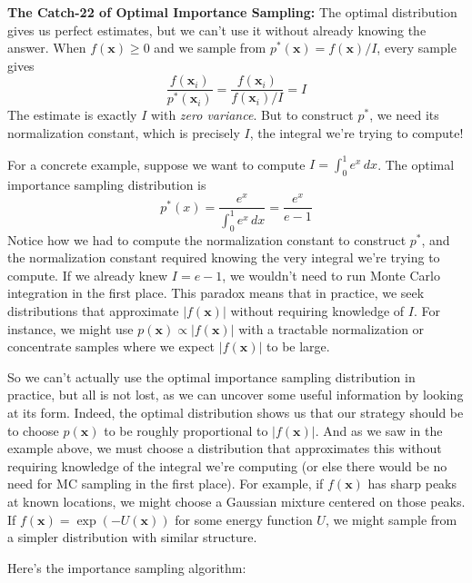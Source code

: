 \begin{exampleBox}
    \textbf{The Catch-22 of Optimal Importance Sampling:} The optimal distribution gives us perfect estimates, but we can't use it without already knowing the answer. When $f(\mathbf{x}) \geq 0$ and we sample from $p^*(\mathbf{x}) = f(\mathbf{x})/I$, every sample gives
    \begin{equation}
    \frac{f(\mathbf{x}_i)}{p^*(\mathbf{x}_i)} = \frac{f(\mathbf{x}_i)}{f(\mathbf{x}_i)/I} = I
    \end{equation}
    The estimate is exactly $I$ with \emph{zero variance}. But to construct $p^*$, we need its normalization constant, which is precisely $I$, the integral we're trying to compute!
    
    For a concrete example, suppose we want to compute $I = \int_0^1 e^x \, dx$. The optimal importance sampling distribution is
    \begin{equation}
    p^*(x) = \frac{e^x}{\int_0^1 e^x \, dx} = \frac{e^x}{e - 1}
    \end{equation}
    Notice how we had to compute the normalization constant to construct $p^*$, and the normalization constant required knowing the very integral we're trying to compute. If we already knew $I = e - 1$, we wouldn't need to run Monte Carlo integration in the first place. This paradox means that in practice, we seek distributions that approximate $|f(\mathbf{x})|$ without requiring knowledge of $I$. For instance, we might use $p(\mathbf{x}) \propto |f(\mathbf{x})|$ with a tractable normalization or concentrate samples where we expect $|f(\mathbf{x})|$ to be large.
\end{exampleBox}
So we can't actually use the optimal importance sampling distribution in practice, but all is not lost, as we can uncover some useful information by looking at its form. Indeed, the optimal distribution shows us that our strategy should be to choose $p(\mathbf{x})$ to be roughly proportional to $|f(\mathbf{x})|$. And as we saw in the example above, we must choose a distribution that approximates this without requiring knowledge of the integral we're computing (or else there would be no need for MC sampling in the first place). For example, if $f(\mathbf{x})$ has sharp peaks at known locations, we might choose a Gaussian mixture centered on those peaks. If $f(\mathbf{x}) = \exp(-U(\mathbf{x}))$ for some energy function $U$, we might sample from a simpler distribution with similar structure.

Here's the importance sampling algorithm:

